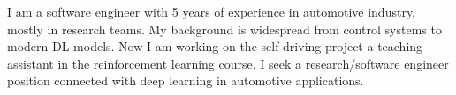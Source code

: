 I am a software engineer with 5 years of experience in automotive industry, mostly
in research teams. My background is widespread from control systems to modern DL
models. Now I am working on the self-driving project a teaching assistant in the
reinforcement learning course. I seek a research/software engineer position
connected with deep learning in automotive applications.
